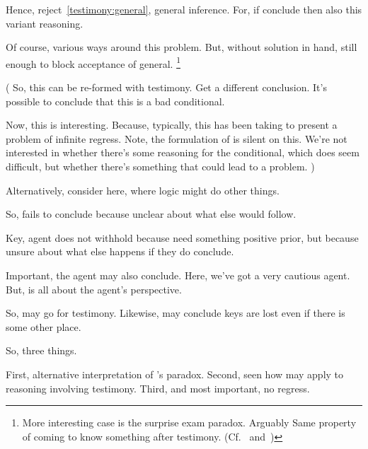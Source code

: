\begin{note}
  Hence, reject~\ref{testimony:general}, general inference.
  For, if conclude then also this variant reasoning.

  Of course, various ways around this problem.
  But, without solution in hand, still enough to block acceptance of general.%
  \footnote{
    More interesting case is the surprise exam paradox.
    Arguably Same property of coming to know something after testimony.
    (Cf.~\textcite{Chow:1998vw} and~\textcite{Gerbrandy:2007vm})
  }


  (
  So, this can be re-formed with testimony.
  Get a different conclusion.
  It's possible to conclude that this is a bad conditional.

  Now, this is interesting.
  Because, typically, this has been taking to present a problem of infinite regress.
  Note, the formulation of \qzS{} is silent on this.
  We're not interested in whether there's some reasoning for the conditional, which does seem difficult, but whether there's something that could lead to a problem.
  )

  Alternatively, consider \citeauthor{Harman:1986ux} here, where logic might do other things.
\end{note}


\begin{note}
  So, fails to conclude because unclear about what else would follow.

  Key, agent does not withhold because need something positive prior, but because unsure about what else happens if they do conclude.
\end{note}

\begin{note}
  Important, the agent may also conclude.
  Here, we've got a very cautious agent.
  But, \qzS{} is all about the agent's perspective.

  So, may go for testimony.
  Likewise, may conclude keys are lost even if there is some other place.

  So, three things.

  First, alternative interpretation of \citeauthor{Carroll:1895uj}'s paradox.
  Second, seen how \qzS{} may apply to reasoning involving testimony.
  Third, and most important, no regress.
\end{note}

